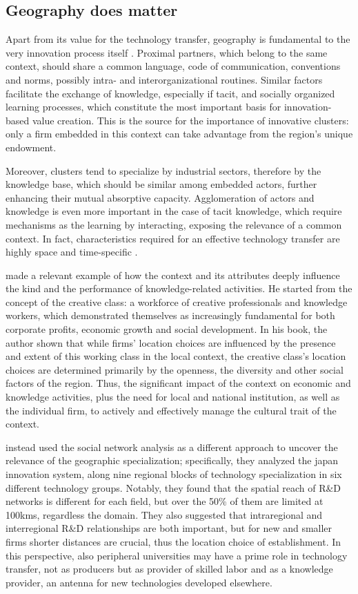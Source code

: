 \subsection{Geography does matter}

Apart from its value for the technology transfer, geography is fundamental to the very innovation process itself \citep{Asheim2009}. Proximal partners, which belong to the same context, should share a common language, code of communication, conventions and norms, possibly intra- and interorganizational routines. Similar factors facilitate the exchange of knowledge, especially if tacit, and socially organized learning processes, which constitute the most important basis for innovation-based value creation. This is the source for the importance of innovative clusters: only a firm embedded in this context can take advantage from the region's unique endowment. 

Moreover, clusters tend to specialize by industrial sectors, therefore by the knowledge base, which should be similar among embedded actors, further enhancing their mutual absorptive capacity. Agglomeration of actors and knowledge is even more important in the case of tacit knowledge, which require mechanisms as the learning by interacting, exposing the relevance of a common context. In fact, characteristics required for an effective technology transfer are highly space and time-specific \citep{Asheim2009}.

\citet{Florida2002} made a relevant example of how the context and its attributes deeply influence the kind and the performance of knowledge-related activities. He started from the concept of the creative class: a workforce of creative professionals and knowledge workers, which demonstrated themselves as increasingly fundamental for both corporate profits, economic growth and social development. In his book, the author shown that while firms' location choices are influenced by the presence and extent of this working class in the local context, the creative class's location choices are determined primarily by the openness, the diversity and other social factors of the region. Thus, the significant impact of the context on economic and knowledge activities, plus the need for local and national institution, as well as the individual firm, to actively and effectively manage the cultural trait of the context. 

\citet{Yokura2013} instead used the social network analysis as a different approach to uncover the relevance of the geographic specialization; specifically, they analyzed the japan innovation system, along nine regional blocks of technology specialization in six different technology groups. Notably, they found that the spatial reach of R\&D networks is different for each field, but over the 50\% of them are limited at 100kms, regardless the domain. They also suggested that intraregional and interregional R\&D relationships are both important, but for new and smaller firms shorter distances are crucial, thus the location choice of establishment. In this perspective, also peripheral universities may have a prime role in technology transfer, not as producers but as provider of skilled labor and as a knowledge provider, an antenna for new technologies developed elsewhere.


